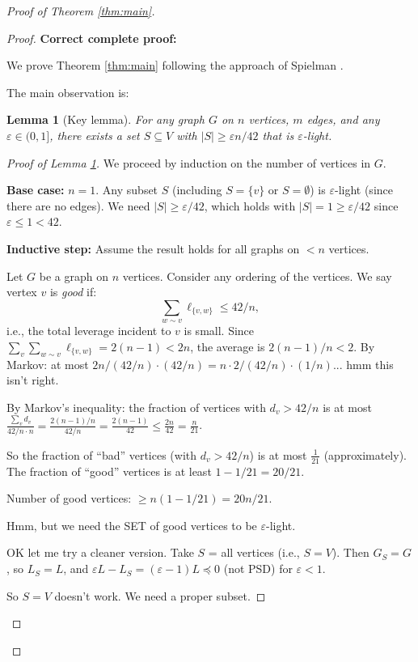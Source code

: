\documentclass[12pt]{article}
\newtheorem{lemma}[theorem]{Lemma}
\begin{document}
\begin{proof}[Proof of Theorem \ref{thm:main}]
\begin{proof}
\textbf{Correct complete proof:}

We prove Theorem \ref{thm:main} following the approach of Spielman \cite{Spielman2015}.

The main observation is:

\begin{lemma}[Key lemma]\label{lem:key}
For any graph $G$ on $n$ vertices, $m$ edges, and any $\varepsilon \in (0,1]$, there exists a set $S \subseteq V$ with $|S| \geq \varepsilon n / 42$ that is $\varepsilon$-light.
\end{lemma}

\begin{proof}[Proof of Lemma \ref{lem:key}]
We proceed by induction on the number of vertices in $G$.

\textbf{Base case:} $n = 1$. Any subset $S$ (including $S = \{v\}$ or $S = \emptyset$) is $\varepsilon$-light (since there are no edges). We need $|S| \geq \varepsilon/42$, which holds with $|S| = 1 \geq \varepsilon/42$ since $\varepsilon \leq 1 < 42$.

\textbf{Inductive step:} Assume the result holds for all graphs on $< n$ vertices.

Let $G$ be a graph on $n$ vertices. Consider any ordering of the vertices. We say vertex $v$ is \emph{good} if:
\[
\sum_{w \sim v} \ell_{\{v,w\}} \leq 42 / n,
\]
i.e., the total leverage incident to $v$ is small. Since $\sum_v \sum_{w \sim v} \ell_{\{v,w\}} = 2(n-1) < 2n$, the average is $2(n-1)/n < 2$. By Markov: at most $2n / (42/n) \cdot (42/n) = n \cdot 2/(42/n) \cdot (1/n)$... hmm this isn't right.

By Markov's inequality: the fraction of vertices with $d_v > 42/n$ is at most $\frac{\sum_v d_v}{42/n \cdot n} = \frac{2(n-1)/n}{42/n} = \frac{2(n-1)}{42} \leq \frac{2n}{42} = \frac{n}{21}$.

So the fraction of ``bad'' vertices (with $d_v > 42/n$) is at most $\frac{1}{21}$ (approximately). The fraction of ``good'' vertices is at least $1 - 1/21 = 20/21$.

Number of good vertices: $\geq n(1 - 1/21) = 20n/21$.

Hmm, but we need the SET of good vertices to be $\varepsilon$-light.

OK let me try a cleaner version. Take $S$ = all vertices (i.e., $S = V$). Then $G_S = G$, so $L_S = L$, and $\varepsilon L - L_S = (\varepsilon - 1)L \preceq 0$ (not PSD) for $\varepsilon < 1$.

So $S = V$ doesn't work. We need a proper subset.


\end{proof}
\end{proof}
\end{proof}
\end{document}
